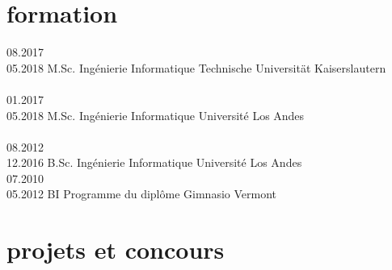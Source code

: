 \documentclass[francais]{cv-style}          %
\begin{document}

\section{formation}

\begin{entrylist}
\entry
{08.2017\\05.2018}
{M.Sc. {\normalfont Ingénierie Informatique}}
{Technische Universität Kaiserslautern}
{\\
\\
{\vspace{-0.1cm}}}
\entry
{01.2017\\05.2018}
{M.Sc. {\normalfont Ingénierie Informatique}}
{Université Los Andes}
{\\
\normalfont{[4.30 (Échelle /5.0)]}\\
{\vspace{-0.1cm}}}
\entry
{08.2012\\12.2016}
{B.Sc. {\normalfont Ingénierie Informatique}}
{Université Los Andes}
{\normalfont{[4.08 (Échelle /5.0)]}\\
{\vspace{-0.1cm}}}
\entry
{07.2010\\05.2012}
{BI {\normalfont Programme du diplôme}}
{Gimnasio Vermont}
{\normalfont{[27 Points]} \\
{\vspace{-0.5cm}}}
\end{entrylist}


\section{projets et concours}
\end{document}
